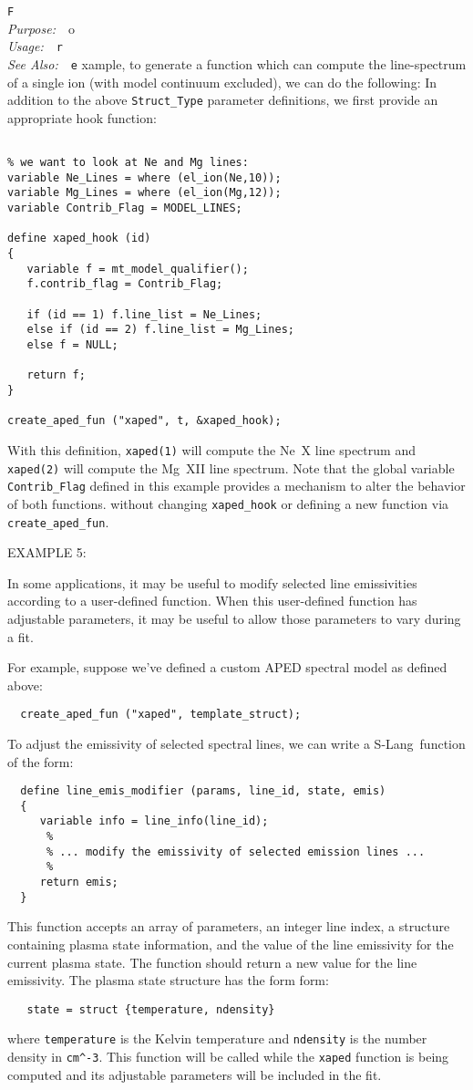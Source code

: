 \documentclass{book}
\makeatletter
\newif\ifpdf
\newcommand{\slang}{{\sc S-Lang}}
\newenvironment{isisfunction}[4]%
{\index{{#1}@{\tt #1}}%
  \ifpdf
  \else
     \addcontentsline{toc}{subsection}{{#1} -- {#2}}
  \fi
  \vbox{
          \vspace*{\baselineskip}
          {\LARGE\tt #1}\vspace*{\baselineskip}\\
          {{\it Purpose:}~~{#2}}\\
          {{\it Usage:}~~{\tt #3}}\\
          {{\it See Also:}~~{\tt #4}}
       }
}%
{ }
\makeatother
\begin{document}
\begin{isisfunction}
For example, to generate a function which can compute the
line-spectrum of a single ion (with model continuum excluded), we
can do the following: In addition to the above \verb|Struct_Type|
parameter definitions, we first provide an appropriate hook
function:

\begin{verbatim}

% we want to look at Ne and Mg lines:
variable Ne_Lines = where (el_ion(Ne,10));
variable Mg_Lines = where (el_ion(Mg,12));
variable Contrib_Flag = MODEL_LINES;

define xaped_hook (id)
{
   variable f = mt_model_qualifier();
   f.contrib_flag = Contrib_Flag;

   if (id == 1) f.line_list = Ne_Lines;
   else if (id == 2) f.line_list = Mg_Lines;
   else f = NULL;

   return f;
}

create_aped_fun ("xaped", t, &xaped_hook);
\end{verbatim}

With this definition, \verb|xaped(1)| will compute the Ne~X line
spectrum and \verb|xaped(2)| will compute the Mg~XII line
spectrum.  Note that the global variable \verb|Contrib_Flag|
defined in this example provides a mechanism to alter the behavior
of both functions. without changing \verb|xaped_hook| or defining
a new function via \verb|create_aped_fun|.

EXAMPLE 5:

In some applications, it may be useful to modify selected line
emissivities according to a user-defined function. When this
user-defined function has adjustable parameters, it may be
useful to allow those parameters to vary during a fit.

For example, suppose we've defined a custom APED spectral model
as defined above:
\begin{verbatim}
  create_aped_fun ("xaped", template_struct);
\end{verbatim}

To adjust the emissivity of selected spectral lines, we can
write a \slang\ function of the form:
\begin{verbatim}
  define line_emis_modifier (params, line_id, state, emis)
  {
     variable info = line_info(line_id);
      %
      % ... modify the emissivity of selected emission lines ...
      %
     return emis;
  }
\end{verbatim}
This function accepts an array of parameters, an integer line
index, a structure containing plasma state information,
and the value of the line emissivity for the current plasma state.
The function should return a
new value for the line emissivity.
The plasma state structure has the form form:
\begin{verbatim}
   state = struct {temperature, ndensity}
\end{verbatim}
where \verb|temperature| is the Kelvin temperature and \verb|ndensity| is the
number density in \verb|cm^-3|. This function will be called while the
\verb|xaped| function is being computed and its adjustable parameters will be
included in the fit.


\end{isisfunction}
\end{document}
